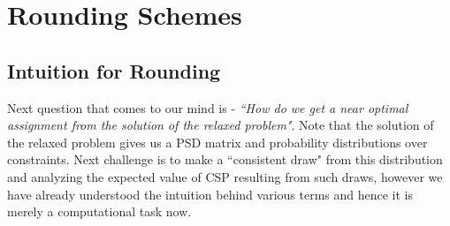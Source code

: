 \section{Rounding Schemes}
\subsection{Intuition for Rounding}
Next question that comes to our mind is - 
\textit{``How do we get a near optimal assignment from the solution of the relaxed problem"}. 
Note that the solution of the relaxed problem gives us a PSD matrix and probability distributions over constraints. 
Next challenge is to make a ``consistent draw" from this distribution and analyzing the expected value of CSP resulting from such draws, 
however we have already understood the intuition behind various terms and hence it is merely a computational task now.  

